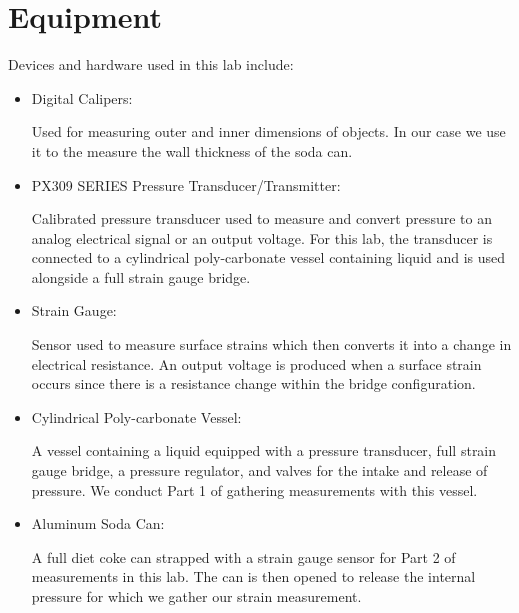 \documentclass{article}
\begin{document}
\section{Equipment}
Devices and hardware used in this lab include:
\begin{itemize}

\item Digital Calipers: 
\vspace{1mm}

Used for measuring outer and inner dimensions of objects. In our case we use it to the measure the wall thickness of the soda can.
\vspace{2.5mm}

\item PX309 SERIES Pressure Transducer/Transmitter:
\vspace{1mm}

Calibrated pressure transducer used to measure and convert pressure to an analog electrical signal or an output voltage. For this lab, the transducer is connected to a cylindrical poly-carbonate vessel containing liquid and is used alongside a full strain gauge bridge.
\vspace{2.5mm}

\item Strain Gauge: 
\vspace{1mm}

Sensor used to measure surface strains which then converts it into a change in electrical resistance. An output voltage is produced when a surface strain occurs since there is a resistance change within the bridge configuration. 
\vspace{2.5mm}

\item Cylindrical Poly-carbonate Vessel: 
\vspace{1mm}

A vessel containing a liquid equipped with a pressure transducer, full strain gauge bridge, a pressure regulator, and valves for the intake and release of pressure. We conduct Part 1 of gathering measurements with this vessel.
\vspace{2.5mm}

\item Aluminum Soda Can:
\vspace{1mm}

A full diet coke can strapped with a strain gauge sensor for Part 2 of measurements in this lab. The can is then opened to release the internal pressure for which we gather our strain measurement.
\vspace{2.5mm}


\end{itemize}
\end{document}
